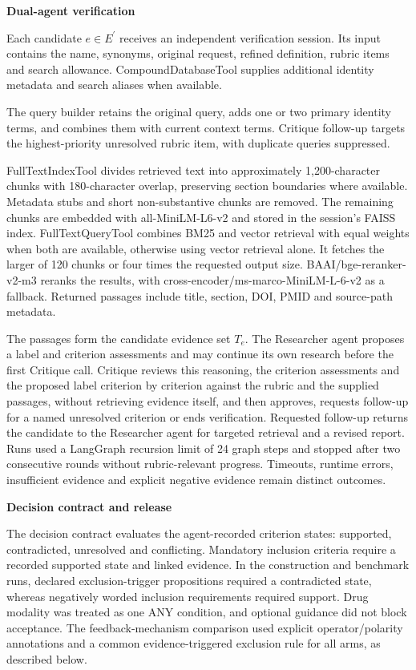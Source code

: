 \documentclass[
]{article}
\begin{document}
\textbf{Dual-agent verification}

Each candidate \(e \in E^{'}\) receives an independent verification session. Its input contains the name, synonyms, original request, refined definition, rubric items and search allowance. CompoundDatabaseTool supplies additional identity metadata and search aliases when available.

The query builder retains the original query, adds one or two primary identity terms, and combines them with current context terms. Critique follow-up targets the highest-priority unresolved rubric item, with duplicate queries suppressed.

FullTextIndexTool divides retrieved text into approximately 1,200-character chunks with 180-character overlap, preserving section boundaries where available. Metadata stubs and short non-substantive chunks are removed. The remaining chunks are embedded with all-MiniLM-L6-v2 and stored in the session's FAISS index. FullTextQueryTool combines BM25 and vector retrieval with equal weights when both are available, otherwise using vector retrieval alone. It fetches the larger of 120 chunks or four times the requested output size. BAAI/bge-reranker-v2-m3 reranks the results, with cross-encoder/ms-marco-MiniLM-L-6-v2 as a fallback. Returned passages include title, section, DOI, PMID and source-path metadata.

The passages form the candidate evidence set $T_e$. The Researcher agent proposes a label and criterion assessments and may continue its own research before the first Critique call. Critique reviews this reasoning, the criterion assessments and the proposed label criterion by criterion against the rubric and the supplied passages, without retrieving evidence itself, and then approves, requests follow-up for a named unresolved criterion or ends verification. Requested follow-up returns the candidate to the Researcher agent for targeted retrieval and a revised report. Runs used a LangGraph recursion limit of 24 graph steps and stopped after two consecutive rounds without rubric-relevant progress. Timeouts, runtime errors, insufficient evidence and explicit negative evidence remain distinct outcomes.

\textbf{Decision contract and release}

The decision contract evaluates the agent-recorded criterion states: supported, contradicted, unresolved and conflicting. Mandatory inclusion criteria require a recorded supported state and linked evidence. In the construction and benchmark runs, declared exclusion-trigger propositions required a contradicted state, whereas negatively worded inclusion requirements required support. Drug modality was treated as one ANY condition, and optional guidance did not block acceptance. The feedback-mechanism comparison used explicit operator/polarity annotations and a common evidence-triggered exclusion rule for all arms, as described below.
\end{document}
